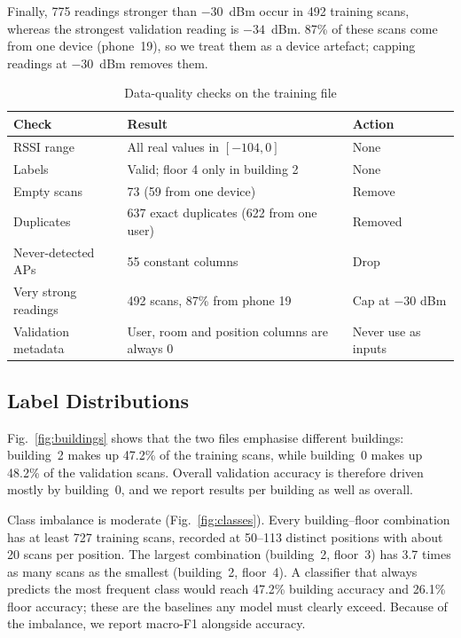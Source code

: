 Finally, 775 readings stronger than $-30$~dBm occur in 492 training scans, whereas the strongest
validation reading is $-34$~dBm. 87\% of these scans come from one device (phone~19), so we treat them
as a device artefact; capping readings at $-30$~dBm removes them.

\begin{table}[!t]
\centering
\caption{Data-quality checks on the training file}
\label{tab:quality}
\setlength{\tabcolsep}{3pt}
\begin{tabular}{p{}p{}p{}}
\toprule
\textbf{Check} & \textbf{Result} & \textbf{Action} \\
\midrule
RSSI range & All real values in $[-104, 0]$ & None \\
Labels & Valid; floor 4 only in building 2 & None \\
Empty scans & 73 (59 from one device) & Remove \\
Duplicates & 637 exact duplicates (622 from one user) & Removed \\
Never-detected APs & 55 constant columns & Drop \\
Very strong readings & 492 scans, 87\% from phone 19 & Cap at $-30$ dBm \\
Validation metadata & User, room and position columns are always 0 & Never use as inputs \\
\bottomrule
\end{tabular}
\end{table}

\subsection{Label Distributions}

Fig.~\ref{fig:buildings} shows that the two files emphasise different buildings: building~2 makes up
47.2\% of the training scans, while building~0 makes up 48.2\% of the validation scans. Overall
validation accuracy is therefore driven mostly by building~0, and we report results per building as
well as overall.

Class imbalance is moderate (Fig.~\ref{fig:classes}). Every building--floor combination has at least
727 training scans, recorded at 50--113 distinct positions with about 20 scans per position. The
largest combination (building~2, floor~3) has 3.7 times as many scans as the smallest (building~2,
floor~4). A classifier that always predicts the most frequent class would reach 47.2\% building
accuracy and 26.1\% floor accuracy; these are the baselines any model must clearly exceed. Because of
the imbalance, we report macro-F1 alongside accuracy.

